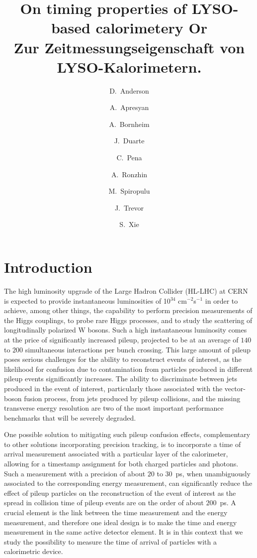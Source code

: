 \documentclass[12pt]{article}
\title{On timing properties of LYSO-based calorimetery Or\\Zur Zeitmessungseigenschaft von LYSO-Kalorimetern.}
\author[1]{D.~Anderson}
\author[1]{A.~Apresyan}
\author[1]{A.~Bornheim}
\author[1]{J.~Duarte}
\author[1]{ C.~Pena}
\author[2]{A.~Ronzhin}
\author[1]{M.~Spiropulu}
\author[1]{J.~Trevor}
\author[1]{S.~Xie}
\affil[1]{California Institute of Technology, Pasadena, CA, USA}
\affil[2]{Fermi National Accelerator Laboratory, Batavia, IL, USA}
\date{}
\begin{document}
\maketitle
{}



\section{Introduction}

The high luminosity upgrade of the Large Hadron Collider (HL-LHC) at CERN
is expected to provide instantaneous luminosities of 10$^{34}$ cm$^{-2}$s$^{-1}$
in order to achieve, among other things, the capability to perform precision 
measurements of the Higgs couplings, to probe rare Higgs processes,
and to study the scattering of longitudinally polarized W bosons. Such a
high instantaneous luminosity comes at the price of significantly increased
pileup, projected to be at an average of $140$ to $200$ simultaneous 
interactions per bunch crossing. This large amount of pileup poses serious
challenges for the ability to reconstruct events of interest, as the 
likelihood for confusion due to contamination from particles produced
in different pileup events significantly increases. The ability to
discriminate between jets produced in the event of interest,
particularly those associated with the vector-boson fusion process,
from jets produced by pileup collisions, and the missing transverse energy
resolution are two of the most important performance benchmarks
that will be severely degraded.

One possible solution to mitigating such pileup confusion effects,
complementary to other solutions incorporating precision tracking,
is to incorporate a time of arrival measurement associated with a
particular layer of the calorimeter, allowing for a timestamp
assignment for both charged particles and photons. Such a measurement
with a precision of about $20$ to $30$~ps, when unambiguously
associated to the corresponding energy measurement, can significantly reduce
the effect of pileup particles on the reconstruction of the
event of interest as the spread in collision time of pileup events
are on the order of about $200$~ps. A crucial element is
the link between the time measurement and the energy measurement,
and therefore one ideal design is to make the time and energy
measurement in the same active detector element. It is in this context 
that we study the possibility to measure the time of arrival of 
particles with a calorimetric device.
\end{document}
